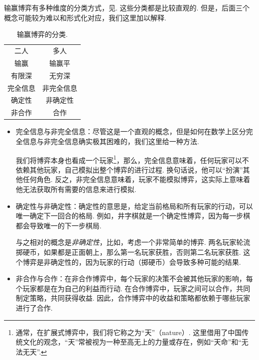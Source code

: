 输赢博弈有多种维度的分类方式，见. 这些分类都是比较直观的. 但是，后面三个概念可能较为难以和形式化对应，我们这里加以解释. 

\begin{table}[ht]
    \centering
    \begin{tabular}{cc}
        \toprule
        二人 & 多人 \\
        输赢 & 输赢平\\
        有限深 & 无穷深 \\
        完全信息 & 非完全信息 \\
        确定性 & 非确定性 \\
        非合作 & 合作\\
        \bottomrule
    \end{tabular}
    \caption{输赢博弈的分类.}
    \label{tab:win-lose-game}
\end{table}

\begin{itemize}
    \item 完全信息与非完全信息：尽管这是一个直观的概念，但是如何在数学上区分完全信息与非完全信息确实极其困难的，我们这里给一种方法. 
    
    我们将博弈本身也看成一个玩家\footnote{通常，在扩展式博弈中，我们将它称之为“天”（nature）. 这里借用了中国传统文化的观念，“天”常被视为一种至高无上的力量或存在，例如“天命”和“无法无天”. }，那么，完全信息意味着，任何玩家可以不依赖其他玩家，自己模拟出整个博弈的进行过程. 换句话说，他可以“扮演”其他任何角色. 反之，非完全信息意味着，玩家不能模拟博弈，这实际上意味着他无法获取所有需要的信息来进行模拟. 

    \item 确定性与非确定性：确定性的意思是，给定当前格局和所有玩家的行动，可以唯一确定下一回合的格局. 例如，井字棋就是一个确定性博弈，因为每一步棋都会导致唯一的下一步棋局.
    
    与之相对的概念是\textit{非确定性}，比如，考虑一个非常简单的博弈. 两名玩家轮流掷硬币，如果都是正面朝上，那么第一名玩家获胜，否则第二名玩家获胜. 这个博弈是非确定性的，因为玩家的行动（掷硬币）会导致多种可能的结果.

    \item 非合作与合作：在非合作博弈中，每个玩家的决策不会被其他玩家的影响，每个玩家都是在为自己的利益而行动. 在合作博弈中，玩家之间可以合作，共同制定策略，共同获得收益. 因此，合作博弈中的收益和策略都依赖于哪些玩家进行了合作. 
\end{itemize}

